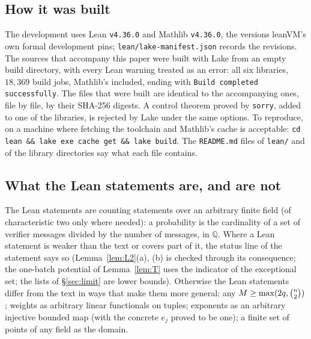 \begin{itemize}[itemsep=1pt,topsep=2pt]
\end{itemize}

\subsection{How it was built}

The development uses Lean \texttt{v4.36.0} and Mathlib \texttt{v4.36.0}, the versions leanVM's own formal development pins; \texttt{lean/lake-manifest.json} records the revisions. The sources that accompany this paper were built with Lake from an empty build directory, with every Lean warning treated as an error: all six libraries, $18{,}369$ build jobs, Mathlib's included, ending with \texttt{Build completed successfully}. The files that were built are identical to the accompanying ones, file by file, by their SHA-256 digests. A control theorem proved by \texttt{sorry}, added to one of the libraries, is rejected by Lake under the same options. To reproduce, on a machine where fetching the toolchain and Mathlib's cache is acceptable: \texttt{cd lean \&\& lake exe cache get \&\& lake build}. The \texttt{README.md} files of \texttt{lean/} and of the library directories say what each file contains.

\subsection{What the Lean statements are, and are not}

The Lean statements are counting statements over an arbitrary finite field (of characteristic two only where needed): a probability is the cardinality of a set of verifier messages divided by the number of messages, in $\mathbb Q$. Where a Lean statement is weaker than the text or covers part of it, the status line of the statement says so (Lemma~\ref{lem:L2}(a), (b) is checked through its consequence; the one-batch potential of Lemma~\ref{lem:T} uses the indicator of the exceptional set; the lists of \S\ref{sec:limit} are lower bounds). Otherwise the Lean statements differ from the text in ways that make them more general: any $M\ge\max(2q,\binom{n}2)$; weights as arbitrary linear functionals on tuples; exponents as an arbitrary injective bounded map (with the concrete $e_j$ proved to be one); a finite set of points of any field as the domain.

